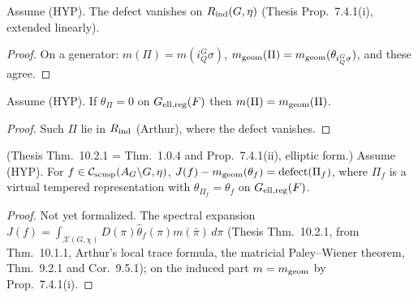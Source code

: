 \begin{proposition}
\label{defect_eq_zero_of_mem_Rind}
\leanok
{}
Assume (HYP). The defect vanishes on $R_{\mathrm{ind}}(G,\eta)$ (Thesis Prop.~7.4.1(i), extended linearly).
\end{proposition}
\begin{proof}
\leanok
{}
On a generator: $m(\Pi)=m(i_Q^G\sigma)$, $m_{\mathrm{geom}}(\Pi)=m_{\mathrm{geom}}(\theta_{i_Q^G\sigma})$, and these agree.
\end{proof}

\begin{proposition}
\label{defect_eq_zero_of_vChar_eq_zero_ell}
\leanok
{}
Assume (HYP). If $\theta_\Pi=0$ on $G_{\mathrm{ell,reg}}(F)$ then $m(\Pi)=m_{\mathrm{geom}}(\Pi)$.
\end{proposition}
\begin{proof}
\leanok
{}
Such $\Pi$ lie in $R_{\mathrm{ind}}$ (Arthur), where the defect vanishes.
\end{proof}

\begin{theorem}
\label{thm_9_1_1_ell}
\leanok
{}
(Thesis Thm.~10.2.1 = Thm.~1.0.4 and Prop.~7.4.1(ii), elliptic form.) Assume (HYP). For
$f\in\mathcal{C}_{\mathrm{scusp}}(A_G\backslash G,\eta)$, $J(f)-m_{\mathrm{geom}}(\theta_f)=\mathrm{defect}(\Pi_f)$, where $\Pi_f$ is a virtual
tempered representation with $\theta_{\Pi_f}=\theta_f$ on $G_{\mathrm{ell,reg}}(F)$.
\end{theorem}
\begin{proof}
Not yet formalized. The spectral expansion $J(f)=\int_{\mathcal X(G,\chi)}D(\pi)\hat\theta_f(\pi)m(\bar\pi)\,d\pi$
(Thesis Thm.~10.2.1, from Thm.~10.1.1, Arthur's local trace formula, the matricial Paley--Wiener theorem,
Thm.~9.2.1 and Cor.~9.5.1); on the induced part $m=m_{\mathrm{geom}}$ by Prop.~7.4.1(i).
\end{proof}

